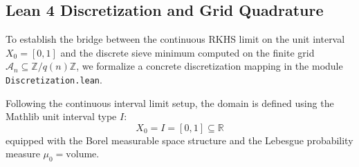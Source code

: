 \documentclass[10pt,twoside]{article}
\begin{document}
\subsection{Lean 4 Discretization and Grid Quadrature} \label{sec:lean-discretization}

To establish the bridge between the continuous RKHS limit on the unit interval $X_0 = [0,1]$ and the discrete sieve minimum computed on the finite grid $\mathcal{A}_n \subseteq \mathbb{Z}/q(n)\mathbb{Z}$, we formalize a concrete discretization mapping in the module \texttt{Discretization.lean}. 

Following the continuous interval limit setup, the domain is defined using the Mathlib unit interval type $I$:
\begin{equation}
X_0 = I = [0, 1] \subseteq \mathbb{R}
\end{equation}
equipped with the Borel measurable space structure and the Lebesgue probability measure $\mu_0 = \text{volume}$. 
\end{document}
